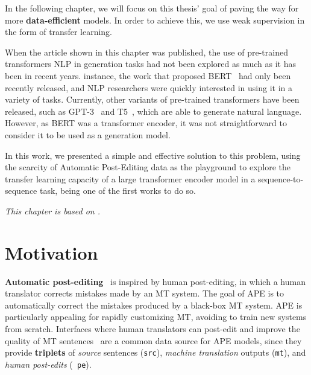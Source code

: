 \label{chap:ape}

\cleardoublepage
\doublespacing

In the following chapter, we will focus on this thesis' goal of
paving the way for more \textbf{data-efficient} models. In order to
achieve this, we use weak supervision in the form of transfer learning.

When the article shown in this chapter was published, the use of
pre-trained transformers %
NLP in generation tasks had not been explored as much as it has been
in recent years.
instance, the work that proposed BERT~\citep{devlin2018bert} had only
been recently released, and NLP researchers were quickly interested in
using it in a variety of tasks. Currently, other variants of
pre-trained transformers have been released, such as
GPT-3~\citep{brown2020language} and
T5~\citep{raffel2020Exploringlimitstransfer}, which are able to
generate natural language. However, as BERT was a transformer
encoder, it was not straightforward to consider it to be used as a
generation model.

In this work, we presented a simple and effective
solution to this problem, using the scarcity of Automatic Post-Editing
data as the playground to explore the transfer learning capacity of a
large transformer encoder model in a sequence-to-sequence task,
being one of the first works to do so.

\emph{This chapter is based on \citet{Correia2019}.}

\section{Motivation}

 {\bf Automatic post-editing}~\citep[APE;][]{simard2007rule} is
inspired by human post-editing, in which a human translator corrects
mistakes made by an MT system.
The goal of APE is to automatically correct the mistakes produced by
a black-box MT system. APE is particularly
appealing for rapidly customizing MT, avoiding to train new systems
from scratch. Interfaces where human translators can post-edit and
improve the quality of MT
sentences~\citep{Alabau2014,Federico2014,Denkowski2015,Hokamp2018}
are a common data source for APE models, since they provide {\bf
        triplets} of {\it source} sentences ({\tt src}), {\it machine
        translation} outputs ({\tt mt}), and {\it human post-edits} ({\tt
        pe}).

